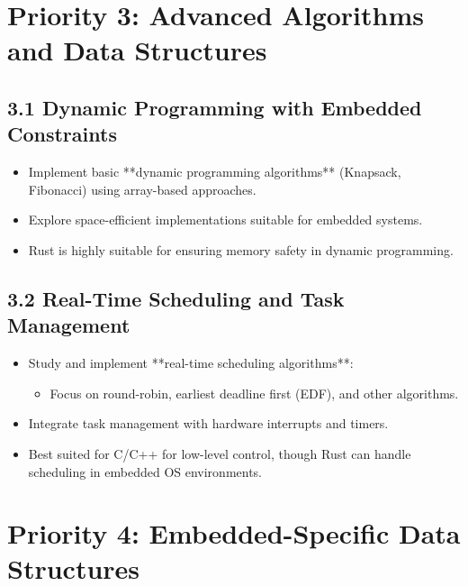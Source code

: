 \documentclass{article}
\begin{document}
\section*{Priority 3: Advanced Algorithms and Data Structures}
\subsection*{3.1 Dynamic Programming with Embedded Constraints}
\begin{itemize}
    \item Implement basic **dynamic programming algorithms** (Knapsack, Fibonacci) using array-based approaches.
    \item Explore space-efficient implementations suitable for embedded systems.
    \item Rust is highly suitable for ensuring memory safety in dynamic programming.
\end{itemize}

\subsection*{3.2 Real-Time Scheduling and Task Management}
\begin{itemize}
    \item Study and implement **real-time scheduling algorithms**:
    \begin{itemize}
        \item Focus on round-robin, earliest deadline first (EDF), and other algorithms.
    \end{itemize}
    \item Integrate task management with hardware interrupts and timers.
    \item Best suited for C/C++ for low-level control, though Rust can handle scheduling in embedded OS environments.
\end{itemize}

\section*{Priority 4: Embedded-Specific Data Structures}
\end{document}
